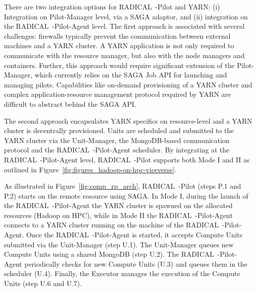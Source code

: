 There are two integration options for RADICAL~-Pilot and YARN: (i) Integration on Pilot-Manager level, via a SAGA adaptor, and (ii) integration on the RADICAL~-Pilot-Agent level.
The first approach is associated with several challenges: firewalls typically prevent the communication between external machines and a YARN cluster.
A YARN application is not only required to communicate with the resource manager, but also with the node managers and containers.
Further, this approach would require significant extension of the Pilot-Manager, which currently relies on the SAGA Job API for launching and managing pilots.
Capabilities like on-demand provisioning of a YARN cluster and complex application-resource management protocol required by YARN are difficult to abstract behind the SAGA API.

The second approach encapsulates YARN specifics on resource-level and a YARN cluster is decentrally provisioned.
Units are scheduled and submitted to the YARN cluster via the Unit-Manager, the MongoDB-based communication protocol and the RADICAL~-Pilot-Agent scheduler.
By integrating at the RADICAL~-Pilot-Agent level, RADICAL~-Pilot supports both Mode I and II as outlined in Figure~\ref{fig:figures_hadoop-on-hpc-viceverse}.

As illustrated in Figure~\ref{fig:comp_rp_arch}, RADICAL~-Pilot  (steps P.1 and P.2) starts on the remote resource using SAGA.
In Mode I, during the launch of the RADICAL~-Pilot-Agent the YARN cluster is spawned on the allocated resources (Hadoop on HPC), while in Mode II the RADICAL~-Pilot-Agent connects to a YARN cluster running on the machine of the RADICAL~-Pilot-Agent.
Once the RADICAL~-Pilot-Agent is started, it accepts Compute Units submitted via the Unit-Manager (step U.1).
The Unit-Manager queues new Compute Units using a shared MongoDB (step U.2).
The RADICAL~-Pilot-Agent periodically checks for new Compute Units (U.3) and queues them in the scheduler (U.4).
Finally, the Executor manages the execution of the Compute Units (step U.6 and U.7).

